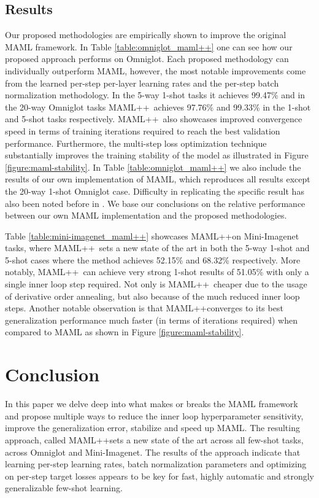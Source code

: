 \documentclass{article} \usepackage[dvipsnames]{xcolor}
\newcommand{\newmaml}{MAML++}
\begin{document}
\subsection{Results}
Our proposed methodologies are empirically shown to improve the original MAML framework. In Table \ref{table:omniglot_maml++} one can see how our proposed approach performs on Omniglot. Each proposed methodology can individually outperform MAML, however, the most notable improvements come from the learned per-step per-layer learning rates and the per-step batch normalization methodology. In the 5-way 1-shot tasks it achieves 99.47\% and in the 20-way Omniglot tasks \newmaml\ achieves 97.76\% and 99.33\% in the 1-shot and 5-shot tasks respectively. \newmaml\ also showcases improved convergence speed in terms of training iterations required to reach the best validation performance. Furthermore, the multi-step loss optimization technique substantially improves the training stability of the model as illustrated in Figure \ref{figure:maml-stability}. In Table \ref{table:omniglot_maml++} we also include the results of our own implementation of MAML, which reproduces all results except the 20-way 1-shot Omniglot case. Difficulty in replicating the specific result has also been noted before in \cite{jamal2018task}. We base our conclusions on the relative performance between our own MAML implementation and the proposed methodologies.

Table \ref{table:mini-imagenet_maml++} showcases \newmaml on Mini-Imagenet tasks, where \newmaml\ sets a new state of the art in both the 5-way 1-shot and 5-shot cases where the method achieves 52.15\% and 68.32\% respectively. More notably, \newmaml\ can achieve very strong 1-shot results of 51.05\% with only a single inner loop step required. Not only is \newmaml\ cheaper due to the usage of derivative order annealing, but also because of the much reduced inner loop steps. Another notable observation is that \newmaml converges to its best generalization performance much faster (in terms of iterations required) when compared to MAML as shown in Figure \ref{figure:maml-stability}.

\section{Conclusion}
In this paper we delve deep into what makes or breaks the MAML framework and propose multiple ways to reduce the inner loop hyperparameter sensitivity, improve the generalization error, stabilize and speed up MAML. The resulting approach, called \newmaml sets a new state of the art across all few-shot tasks, across Omniglot and Mini-Imagenet. The results of the approach indicate that learning per-step learning rates, batch normalization parameters and optimizing on per-step target losses appears to be key for fast, highly automatic and strongly generalizable few-shot learning. 
\end{document}
